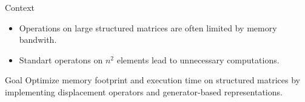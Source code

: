 \begin{frame}{Context}
  \begin{itemize}
    \item Operations on large structured matrices are often limited by memory bandwith.
    \item Standart operatons on $n^2$ elements lead to unnecessary computations.
  \end{itemize}
  \vspace{1em}
  \begin{block}{Goal}
    Optimize memory footprint and execution time on structured matrices by implementing displacement operators and generator-based representations.
  \end{block}
\end{frame}
